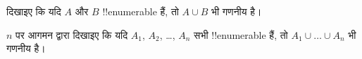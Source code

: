 \documentclass[../../../include/open-logic-section]{subfiles}
\begin{document}
\begin{prob}
दिखाइए कि यदि $A$ और $B$ !!{enumerable} हैं, तो $A \cup B$ भी
गणनीय है।
\end{prob}

\begin{prob}
$n$ पर आगमन द्वारा दिखाइए कि यदि $A_1$, $A_2$, \dots, $A_n$ सभी
!!{enumerable} हैं, तो $A_1 \cup \dots \cup A_n$ भी गणनीय है।
\end{prob}
\end{document}
